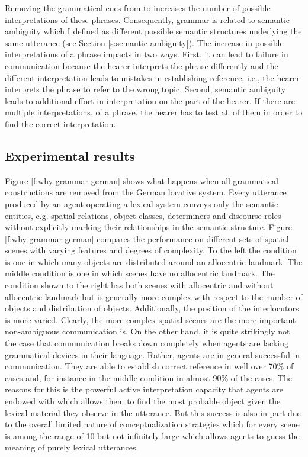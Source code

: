 Removing the grammatical cues from 
 to 
increases the number of possible interpretations of these phrases.
Consequently, grammar is related to semantic 
ambiguity which I defined as different possible semantic structures underlying the 
same utterance (see Section \ref{s:semantic-ambiguity}). 
The increase in possible interpretations of a phrase
impacts in two ways. First, it can lead to failure in communication 
because the hearer interprets the phrase differently and the different 
interpretation leads to mistakes in 
establishing reference, i.e., the hearer interprets the phrase to refer to the wrong
topic. Second, semantic ambiguity leads to additional 
effort in interpretation on the part of the hearer. If there are multiple interpretations, of 
a phrase, the hearer has to test all of them in order to find the correct interpretation.

\subsection{Experimental results}
Figure \ref{f:why-grammar-german} shows what happens when all 
grammatical constructions are removed from the German locative 
system. Every utterance produced by an agent operating a lexical 
system conveys only the semantic entities, e.g. spatial relations, 
object classes, determiners and discourse roles without explicitly 
marking their relationships in the semantic structure. Figure 
\ref{f:why-grammar-german} compares the performance on different 
sets of spatial scenes with varying features and degrees of complexity. 
To the left the condition is one in which many objects are distributed 
around an allocentric landmark. The middle condition is one in which 
scenes have no allocentric landmark. The condition 
shown to the right has both scenes with allocentric and 
without allocentric landmark but is generally more complex with 
respect to the number of objects and distribution of objects. 
Additionally, the position of the interlocutors is more varied. Clearly, the more complex 
spatial scenes are the more important non-ambiguous communication is. On the other hand, 
it is quite strikingly not the case that communication breaks down completely when agents are lacking grammatical devices in their language. Rather, agents are in general successful in communication. 
They are able to establish correct reference in well over 70\% of cases and, for instance in the middle condition in almost 90\% of the cases. 
The reasons for this is the powerful active interpretation capacity that agents are
endowed with which allows them to find the most probable object given the 
lexical material they observe in the utterance. But this success is also in part 
due to the overall limited nature of conceptualization strategies which for every 
scene is among the range of 10 but not infinitely large which allows agents to guess 
the meaning of purely lexical utterances.

